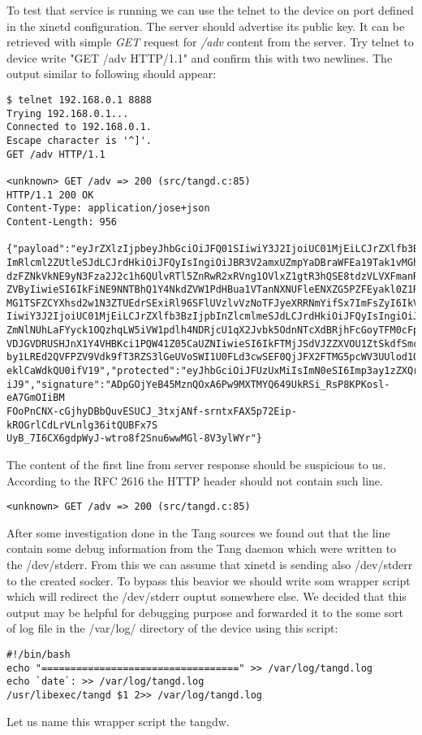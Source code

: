 To test that service is running we can use the telnet to the device on port defined in the xinetd configuration.
The server should advertise its public key.
It can be retrieved with simple {\it GET} request for {\it /adv} content from the server.
Try telnet to device write "GET /adv HTTP/1.1" and confirm this with two newlines.
The output similar to following should appear:
\begin{lstlisting}[columns=fixed,basicstyle=\ttfamily\footnotesize,tabsize=4,backgroundcolor=\color{yellow!10}]
$ telnet 192.168.0.1 8888
Trying 192.168.0.1...
Connected to 192.168.0.1.
Escape character is '^]'.
GET /adv HTTP/1.1

<unknown> GET /adv => 200 (src/tangd.c:85)
HTTP/1.1 200 OK
Content-Type: application/jose+json
Content-Length: 956

{"payload":"eyJrZXlzIjpbeyJhbGciOiJFQ01SIiwiY3J2IjoiUC01MjEiLCJrZXlfb3BzIjpb
ImRlcml2ZUtleSJdLCJrdHkiOiJFQyIsIngiOiJBR3V2amxUZmpYaDBraWFEa19Tak1vMGhYUm1R
dzFZNkVkNE9yN3Fza2J2c1h6QUlvRTl5ZnRwR2xRVng1OVlxZ1gtR3hQSE8tdzVLVXFmanRGQkVV
ZVByIiwieSI6IkFiNE9NNTBhQ1Y4NkdZVW1PdHBua1VTanNXNUFleENXZG5PZFEyakl0Z1RGNXNq
MG1TSFZCYXhsd2w1N3ZTUEdrSExiRl96SFlUVzlvVzNoTFJyeXRRNmYifSx7ImFsZyI6IkVTNTEy
IiwiY3J2IjoiUC01MjEiLCJrZXlfb3BzIjpbInZlcmlmeSJdLCJrdHkiOiJFQyIsIngiOiJBQVpS
ZmNlNUhLaFYyck1OQzhqLW5iVW1pdlh4NDRjcU1qX2Jvbk5OdnNTcXdBRjhFcGoyTFM0cFpfdUNR
VDJGVDRUSHJnX1Y4VHBKci1PQW41Z05CaUZNIiwieSI6IkFTMjJSdVJZZXVOU1ZtSkdfSmcwSW1n
by1LREd2QVFPZV9Vdk9fT3RZS3lGeUVoSWI1U0FLd3cwSEF0QjJFX2FTMG5pcWV3UUlod1QyanR5
eklCaWdkQU0ifV19","protected":"eyJhbGciOiJFUzUxMiIsImN0eSI6Imp3ay1zZXQranNvb
iJ9","signature":"ADpGOjYeB45MznQOxA6Pw9MXTMYQ649UkRSi_RsP8KPKosl-eA7GmOIiBM
FOoPnCNX-cGjhyDBbQuvESUCJ_3txjANf-srntxFAX5p72Eip-kROGrlCdLrVLnlg36itQUBFx7S
UyB_7I6CX6gdpWyJ-wtro8f2Snu6wwMGl-8V3ylWYr"}
\end{lstlisting}
The content of the first line from server response should be suspicious to us.
According to the RFC 2616 the HTTP header should not contain such line\cite{RFC2616}.
\begin{lstlisting}[columns=fixed,basicstyle=\ttfamily\footnotesize,tabsize=4,backgroundcolor=\color{yellow!10}]
<unknown> GET /adv => 200 (src/tangd.c:85)
\end{lstlisting}
After some investigation done in the Tang sources we found out that the line contain some debug information from the Tang daemon which were written to the /dev/stderr.
From this we can assume that xinetd is sending also /dev/stderr to the created socker.
To bypass this beavior we should write som wrapper script which will redirect the /dev/stderr ouptut somewhere else.
We decided that this output may be helpful for debugging purpose and forwarded it to the some sort of log file in the /var/log/ directory of the device using this script:
\begin{lstlisting}[columns=fixed,basicstyle=\ttfamily\footnotesize,tabsize=4,backgroundcolor=\color{yellow!10}]
#!/bin/bash
echo "==================================" >> /var/log/tangd.log
echo `date`: >> /var/log/tangd.log
/usr/libexec/tangd $1 2>> /var/log/tangd.log
\end{lstlisting}
Let us name this wrapper script the tangdw.

